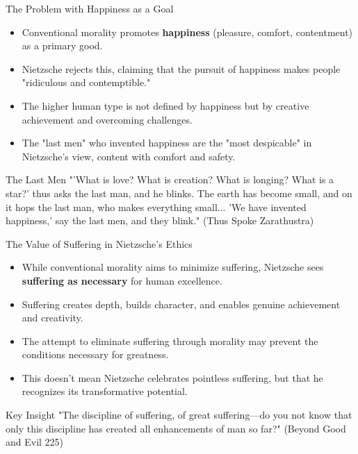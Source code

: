 \documentclass{beamer}
\begin{document}
\begin{frame}{The Problem with Happiness as a Goal}
\begin{itemize}
\item Conventional morality promotes \textbf{happiness} (pleasure, comfort, contentment) as a primary good.
\item Nietzsche rejects this, claiming that the pursuit of happiness makes people "ridiculous and contemptible."
\item The higher human type is not defined by happiness but by creative achievement and overcoming challenges.
\item The "last men" who invented happiness are the "most despicable" in Nietzsche's view, content with comfort and safety.
\end{itemize}

\begin{exampleblock}{The Last Men}
"'What is love? What is creation? What is longing? What is a star?' thus asks the last man, and he blinks. The earth has become small, and on it hops the last man, who makes everything small... 'We have invented happiness,' say the last men, and they blink." (Thus Spoke Zarathustra)
\end{exampleblock}
\end{frame}

\begin{frame}{The Value of Suffering in Nietzsche's Ethics}
\begin{itemize}
\item While conventional morality aims to minimize suffering, Nietzsche sees \textbf{suffering as necessary} for human excellence.
\item Suffering creates depth, builds character, and enables genuine achievement and creativity.
\item The attempt to eliminate suffering through morality may prevent the conditions necessary for greatness.
\item This doesn't mean Nietzsche celebrates pointless suffering, but that he recognizes its transformative potential.
\end{itemize}

\begin{alertblock}{Key Insight}
"The discipline of suffering, of great suffering—do you not know that only this discipline has created all enhancements of man so far?" (Beyond Good and Evil 225)
\end{alertblock}
\end{frame}
\end{document}
